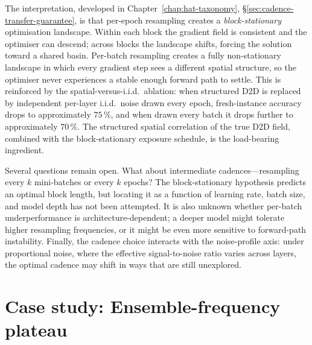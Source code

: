The interpretation, developed in Chapter~\ref{chap:hat-taxonomy}, \S\ref{sec:cadence-transfer-guarantee}, is that per-epoch resampling creates a \emph{block-stationary} optimisation landscape.  Within each block the gradient field is consistent and the optimiser can descend; across blocks the landscape shifts, forcing the solution toward a shared basin.  Per-batch resampling creates a fully non-stationary landscape in which every gradient step sees a different spatial structure, so the optimiser never experiences a stable enough forward path to settle.  This is reinforced by the spatial-versus-i.i.d.~ablation: when structured D2D is replaced by independent per-layer i.i.d.~noise drawn every epoch, fresh-instance accuracy drops to approximately $75\,\%$, and when drawn every batch it drops further to approximately $70\,\%$.  The structured spatial correlation of the true D2D field, combined with the block-stationary exposure schedule, is the load-bearing ingredient.

Several questions remain open.  What about intermediate cadences---resampling every $k$ mini-batches or every $k$ epochs?  The block-stationary hypothesis predicts an optimal block length, but locating it as a function of learning rate, batch size, and model depth has not been attempted.  It is also unknown whether per-batch underperformance is architecture-dependent; a deeper model might tolerate higher resampling frequencies, or it might be even more sensitive to forward-path instability.  Finally, the cadence choice interacts with the noise-profile axis: under proportional noise, where the effective signal-to-noise ratio varies across layers, the optimal cadence may shift in ways that are still unexplored.


\section{Case study: Ensemble-frequency plateau}
\label{sec:case-frequency-plateau}

